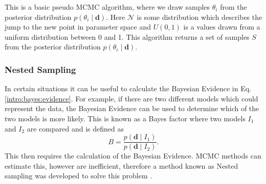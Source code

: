 \begin{algorithm}
	\centering
	\begin{algorithmic}[1]
		 
		 
		\STATE
		
			\ELSE
				\ELSE
				\ENDIF
		\ENDIF
		\ENDFOR
		\STATE

	\end{algorithmic}
	\caption[Simple MCMC algorithm]{This is a basic pseudo MCMC algorithm, where we draw samples $\theta_i$ from the posterior distribution $p(\theta_i \mid \bm{d})$. Here $\mathcal{N}$ is some distribution which describes the jump to the new point in parameter space and $U(0,1)$ is a values drawn from a uniform distribution between 0 and 1. This algorithm returns a set of samples $S$ from the posterior distribution $p(\theta_i \mid \bm{d})$. \label{searchcw:bayes:mcmc_alg}}
\end{algorithm}

%
\subsubsection{Nested Sampling}
%

In certain situations it can be useful to calculate the Bayesian Evidence in Eq.\ref{intro:bayes:evidence}.  For example, if there are two
different models which could represent the data, the Bayesian Evidence can be used to
determine which of the two models is more likely.  This is known as a Bayes
factor where two models $I_1$ and $I_2$ are compared and is defined as
%
\begin{equation}
B = \frac{p({\bm d} \mid I_1)}{p({\bm d} \mid I_2)}.
\end{equation}
%
This then requires the calculation of the
Bayesian Evidence. \gls{MCMC} methods can estimate this, however are inefficient, therefore a method known as Nested
sampling was developed to solve this problem \citep{skilling2006NestedSampling,speagle2019DynestyDynamic}.

